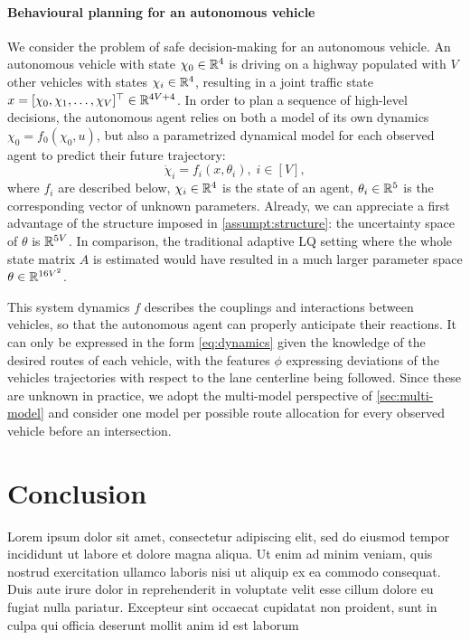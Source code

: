 \documentclass{article}
\begin{document}
\paragraph{Behavioural planning for an autonomous vehicle}
We consider the problem of safe decision-making for an autonomous vehicle. An autonomous vehicle with state $\chi_0\in\mathbb{R}^4$ is driving on a highway populated with $V$ other vehicles with states $\chi_i\in\mathbb{R}^4$, resulting in a joint traffic state $x = [\chi_0, \chi_1,\dots,\chi_V]^\top\in\mathbb{R}^{4V+4}$. In order to plan a sequence of high-level decisions, the autonomous agent relies on both a model of its own dynamics $\chi_0 = f_0(\chi_0,u)$, but also a parametrized dynamical model for each observed agent to predict their future trajectory: \[\dot{\chi}_i=f_i(x,\theta_i),\;i\in[V],\] where $f_i$ are described below, $\chi_i\in\mathbb{R}^4$ is the state of an agent, $\theta_i\in\mathbb{R}^5$ is the corresponding vector of unknown parameters. Already, we can appreciate a first advantage of the structure imposed in \autoref{assumpt:structure}: the uncertainty space of $\theta$ is $\mathbb{R}^{5V}$. In comparison, the traditional adaptive LQ setting where the whole state matrix $A$ is estimated would have resulted in a much larger parameter space $\theta\in\mathbb{R}^{16V^2}$.

This system dynamics $f$ describes the couplings and interactions between vehicles, so that the autonomous agent can properly anticipate their reactions. It can only be expressed in the form \eqref{eq:dynamics} given the knowledge of the desired routes of each vehicle, with the features $\phi$ expressing deviations of the vehicles trajectories with respect to the lane centerline being followed. Since these are unknown in practice, we adopt the multi-model perspective of \autoref{sec:multi-model} and consider one model per possible route allocation for every observed vehicle before an intersection.

\section*{Conclusion}


Lorem ipsum dolor sit amet, consectetur adipiscing elit, sed do eiusmod tempor incididunt ut labore et dolore magna aliqua. Ut enim ad minim veniam, quis nostrud exercitation ullamco laboris nisi ut aliquip ex ea commodo consequat. Duis aute irure dolor in reprehenderit in voluptate velit esse cillum dolore eu fugiat nulla pariatur. Excepteur sint occaecat cupidatat non proident, sunt in culpa qui officia deserunt mollit anim id est laborum
\end{document}
